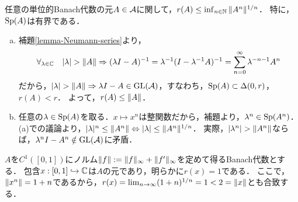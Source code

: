 \documentclass[uplatex,dvipdfmx]{jsreport}
\begin{document}
\begin{lemma}[Beurling]
    任意の単位的Banach代数の元$A\in\mathcal{A}$に関して，$r(A)\le\inf_{n\in\mathbb{N}}\|A^n\|^{1/n}$．
    特に，$\mathrm{Sp}(A)$は有界である．
\end{lemma}
\begin{Proof}\mbox{}
    \begin{enumerate}[(a)]
        \item 補題\ref{lemma-Neumann-series}より，
        \[\forall_{\lambda\in\mathbb{C}}\quad\lvert\lambda\rvert>\|A\|\Rightarrow(\lambda I-A)^{-1}=\lambda^{-1}(I-\lambda^{-1}A)^{-1}=\sum^\infty_{n=0}\lambda^{-n-1}A^n\]
        だから，$\lvert\lambda\rvert>\|A\|\Rightarrow\lambda I-A\in\mathrm{GL}(\mathcal{A})$，すなわち，$\mathrm{Sp}(A)\subset\Delta(0,r)$，$r(A)<r$．
        よって，$r(A)\le\|A\|$．
        \item 任意の$\lambda\in\mathrm{Sp}(A)$を取る．$x\mapsto x^n$は整関数だから，補題より，$\lambda^n\in\mathrm{Sp}(A^n)$．(a)での議論より，$\lvert\lambda\rvert^n\le\|A^n\|\Leftrightarrow\lvert\lambda\rvert\le\|A^n\|^{1/n}$．
        実際，$\lvert\lambda^n\rvert>\|A^n\|$ならば，$\lambda^nI-A^n\notin\mathrm{GL}(\mathcal{A})$に矛盾．
    \end{enumerate}
\end{Proof}
\begin{example}
    $A$を$C^1([0,1])$にノルム$\|f\|:=\|f\|_\infty+\|f'\|_\infty$を定めて得るBanach代数とする．
    包含$x:[0,1]\hookrightarrow\mathbb{C}$は$A$の元であり，明らかに$r(x)=1$である．
    ここで，$\|x^n\|=1+n$であるから，$r(x)=\lim_{n\to\infty}(1+n)^{1/n}=1<2=\|x\|$とも合致する．
\end{example}
\end{document}
